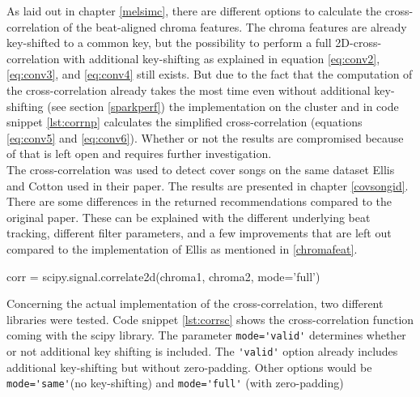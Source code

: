 As laid out in chapter \ref{melsimc}, there are different options to calculate the cross-correlation of the beat-aligned chroma features. The chroma features are already key-shifted to a common key, but the possibility to perform a full 2D-cross-correlation with additional key-shifting as explained in equation \ref{eq:conv2}, \ref{eq:conv3}, and \ref{eq:conv4} still exists. But due to the fact that the computation of the cross-correlation already takes the most time even without additional key-shifting (see section \ref{sparkperf}) the implementation on the cluster and in code snippet \ref{lst:corrnp} calculates the simplified cross-correlation (equations \ref{eq:conv5} and \ref{eq:conv6}). Whether or not the results are compromised because of that is left open and requires further investigation.\\
\noindent The cross-correlation was used to detect cover songs on the same dataset Ellis and Cotton used in their paper\cite{cover802}. The results are presented in chapter \ref{covsongid}. There are some differences in the returned recommendations compared to the original paper. These can be explained with the different underlying beat tracking, different filter parameters, and a few improvements that are left out compared to the implementation of Ellis \cite{cover802} as mentioned in \ref{chromafeat}.\\

\begin{pythonCode}[frame=single,label={lst:corrsc},caption={cross-correlation scipy},captionpos=b]
corr = scipy.signal.correlate2d(chroma1, chroma2, mode='full')
\end{pythonCode}

\noindent Concerning the actual implementation of the cross-correlation, two different libraries were tested. Code snippet \ref{lst:corrsc} shows the cross-correlation function coming with the scipy library.
\noindent The parameter \lstinline{mode='valid'} determines whether or not additional key shifting is included. The \lstinline{'valid'} option already includes additional key-shifting but without zero-padding. Other options would be \lstinline{mode='same'}(no key-shifting) and \lstinline{mode='full'} (with zero-padding)\\

